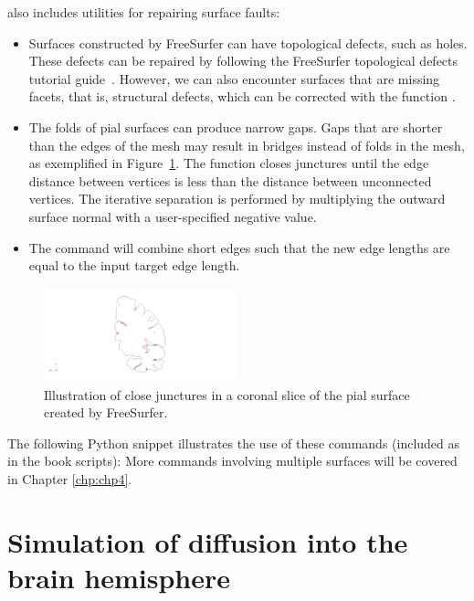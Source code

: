 \svmtk{} also includes utilities for repairing surface faults:
\begin{itemize}
\item
  Surfaces constructed by FreeSurfer can have topological defects,
  such as holes. These defects can be repaired by following the
  FreeSurfer topological defects tutorial guide~\cite{freesurfer-wiki}.
  However, we can also encounter surfaces that are missing facets,
  that is, structural defects, which can be corrected with the \svmtk{}
  function .
\item
  The folds of pial surfaces can produce narrow gaps. Gaps that are
  shorter than the edges of the mesh may result in bridges instead
  of folds in the mesh, as exemplified in
  Figure~\ref{fig:chp3:juncture}. The function
  closes junctures until the edge distance between vertices is less
  than the distance between unconnected vertices. The iterative
  separation is performed by multiplying the outward surface normal
  with a user-specified negative value. 
\item 
  The command  will combine short edges
  such that the new edge lengths are equal to the input target edge
  length.
\end{itemize}
\begin{figure}\sidecaption
  \includegraphics[width=0.5\textwidth]{./graphics/chp3/juncturers-gap.png}
  \caption{Illustration of close junctures in a coronal
    slice of the pial surface created by FreeSurfer.}
  \label{fig:chp3:juncture}
\end{figure}
%
%
The following Python snippet illustrates the use of these commands
(included as  in the
book scripts):
More commands involving multiple surfaces will be
covered in Chapter \ref{chp:chp4}.

\section{Simulation of diffusion into the brain hemisphere}
\label{sec:chp3:math}

